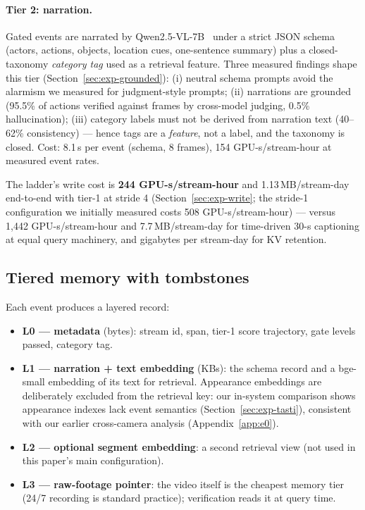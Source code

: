 \paragraph{Tier 2: narration.} Gated events are narrated by Qwen2.5-VL-7B~\cite{qwen25vl} under a strict JSON schema (actors, actions, objects, location cues, one-sentence summary) plus a closed-taxonomy \emph{category tag} used as a retrieval feature. Three measured findings shape this tier (Section~\ref{sec:exp-grounded}): (i) neutral schema prompts avoid the alarmism we measured for judgment-style prompts; (ii) narrations are grounded (95.5\% of actions verified against frames by cross-model judging, 0.5\% hallucination); (iii) category labels must not be derived from narration text (40--62\% consistency) --- hence tags are a \emph{feature}, not a label, and the taxonomy is closed. Cost: 8.1\,s per event (schema, 8 frames), 154 GPU-s/stream-hour at measured event rates.

The ladder's write cost is \textbf{244 GPU-s/stream-hour} and 1.13\,MB/stream-day end-to-end with tier-1 at stride 4 (Section~\ref{sec:exp-write}; the stride-1 configuration we initially measured costs 508 GPU-s/stream-hour) --- versus 1{,}442 GPU-s/stream-hour and 7.7\,MB/stream-day for time-driven 30-s captioning at equal query machinery, and gigabytes per stream-day for KV retention.

\subsection{Tiered memory with tombstones}
\label{sec:design-memory}

Each event produces a layered record:
\begin{itemize}
\item \textbf{L0 --- metadata} (bytes): stream id, span, tier-1 score trajectory, gate levels passed, category tag.
\item \textbf{L1 --- narration + text embedding} (KBs): the schema record and a bge-small embedding of its text for retrieval. Appearance embeddings are deliberately excluded from the retrieval key: our in-system comparison shows appearance indexes lack event semantics (Section~\ref{sec:exp-tasti}), consistent with our earlier cross-camera analysis (Appendix~\ref{app:e0}).
\item \textbf{L2 --- optional segment embedding}: a second retrieval view (not used in this paper's main configuration).
\item \textbf{L3 --- raw-footage pointer}: the video itself is the cheapest memory tier (24/7 recording is standard practice); verification reads it at query time.
\end{itemize}

